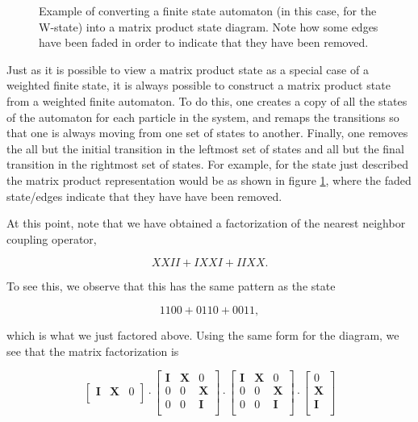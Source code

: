 \documentclass{amsbook}
\theoremstyle{plain}
\theoremstyle{definition}
\theoremstyle{remark}
\begin{document}
\begin{figure}
\caption{Example of converting a finite state automaton (in this case, for the W-state) into a matrix product state diagram.  Note how some edges have been faded in order to indicate that they have been removed.}
\label{fig:automaton2mps}
\end{figure}

Just as it is possible to view a matrix product state as a special case of a weighted finite state, it is always possible to construct a matrix product state from a weighted finite automaton.  To do this, one creates a copy of all the states of the automaton for each particle in the system, and remaps the transitions so that one is always moving from one set of states to another.  Finally, one removes the all but the initial transition in the leftmost set of states and all but the final transition in the rightmost set of states.  For example, for the state just described the matrix product representation would be as shown in figure \ref{fig:automaton2mps}, where the faded state/edges indicate that they have have been removed.

At this point, note that we have obtained a factorization of the nearest neighbor coupling operator,

$$XXII + IXXI + IIXX.$$

To see this, we observe that this has the same pattern as the state

$$1100 + 0110 + 0011,$$

\noindent which is what we just factored above.  Using the same form for the diagram, we see that the matrix factorization is 

$$
\begin{bmatrix}
\textbf{I} & \textbf{X} & 0 \\
\end{bmatrix}
\cdot
\begin{bmatrix}
\textbf{I} & \textbf{X} & 0 \\
0 & 0 & \textbf{X} \\
0 & 0 & \textbf{I} \\
\end{bmatrix}
\cdot
\begin{bmatrix}
\textbf{I} & \textbf{X} & 0 \\
0 & 0 & \textbf{X} \\
0 & 0 & \textbf{I} \\
\end{bmatrix}
\cdot
\begin{bmatrix}
0 \\
\textbf{X} \\
\textbf{I} \\
\end{bmatrix}
$$
\end{document}
